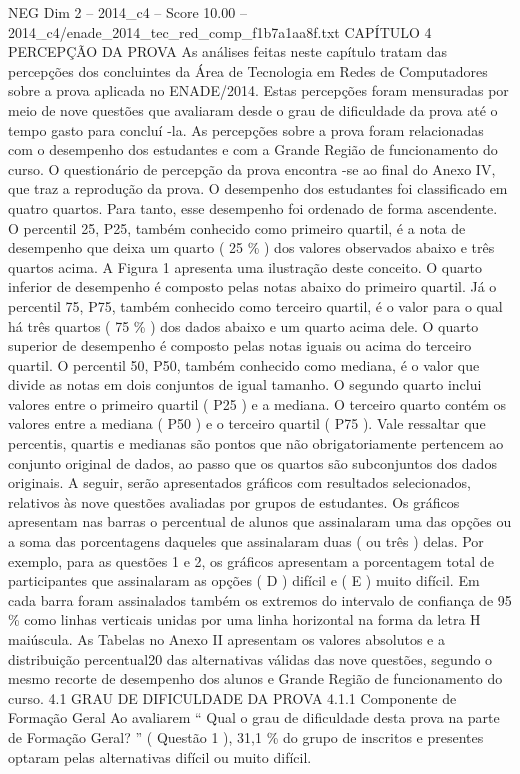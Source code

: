 \begin{textsample}{NEG Dim 2 – 2014\_c4 – Score 10.00 – 2014\_c4/enade\_2014\_tec\_red\_comp\_f1b7a1aa8f.txt}  \label{ex:f2_neg_324}
CAPÍTULO 4 PERCEPÇÃO DA PROVA As análises feitas neste capítulo tratam das percepções dos concluintes da Área de Tecnologia em Redes de Computadores sobre a prova aplicada no ENADE/2014.
Estas percepções foram mensuradas por meio de nove questões que avaliaram desde o grau de dificuldade da prova até o tempo gasto para concluí -la.
As percepções sobre a prova foram relacionadas com o desempenho dos estudantes e com a Grande Região de funcionamento do curso.
O questionário de percepção da prova encontra -se ao final do Anexo IV, que traz a reprodução da prova.
O desempenho dos estudantes foi classificado em quatro quartos.
Para tanto, esse desempenho foi ordenado de forma ascendente.
O percentil 25, P25, também conhecido como primeiro quartil, é a nota de desempenho que deixa um quarto ( 25 \% ) dos valores observados abaixo e três quartos acima.
A Figura 1 apresenta uma ilustração deste conceito.
O quarto inferior de desempenho é composto pelas notas abaixo do primeiro quartil.
Já o percentil 75, P75, também conhecido como terceiro quartil, é o valor para o qual há três quartos ( 75 \% ) dos dados abaixo e um quarto acima dele.
O quarto superior de desempenho é composto pelas notas iguais ou acima do terceiro quartil.
O percentil 50, P50, também conhecido como mediana, é o valor que divide as notas em dois conjuntos de igual tamanho.
O segundo quarto inclui valores entre o primeiro quartil ( P25 ) e a mediana.
O terceiro quarto contém os valores entre a mediana ( P50 ) e o terceiro quartil ( P75 ).
Vale ressaltar que percentis, quartis e medianas são pontos que não obrigatoriamente pertencem ao conjunto original de dados, ao passo que os quartos são subconjuntos dos dados originais.
A seguir, serão apresentados gráficos com resultados selecionados, relativos às nove questões avaliadas por grupos de estudantes.
Os gráficos apresentam nas barras o percentual de alunos que assinalaram uma das opções ou a soma das porcentagens daqueles que assinalaram duas ( ou três ) delas.
Por exemplo, para as questões 1 e 2, os gráficos apresentam a porcentagem total de participantes que assinalaram as opções ( D ) difícil e ( E ) muito difícil.
Em cada barra foram assinalados também os extremos do intervalo de confiança de 95 \% como linhas verticais unidas por uma linha horizontal na forma da letra H maiúscula.
As Tabelas no Anexo II apresentam os valores absolutos e a distribuição percentual20 das alternativas válidas das nove questões, segundo o mesmo recorte de desempenho dos alunos e Grande Região de funcionamento do curso. 4.1 GRAU DE DIFICULDADE DA PROVA 4.1.1 Componente de Formação Geral Ao avaliarem “ Qual o grau de dificuldade desta prova na parte de Formação Geral? ” ( Questão 1 ), 31,1 \% do grupo de inscritos e presentes optaram pelas alternativas difícil ou muito difícil.

\end{textsample}
